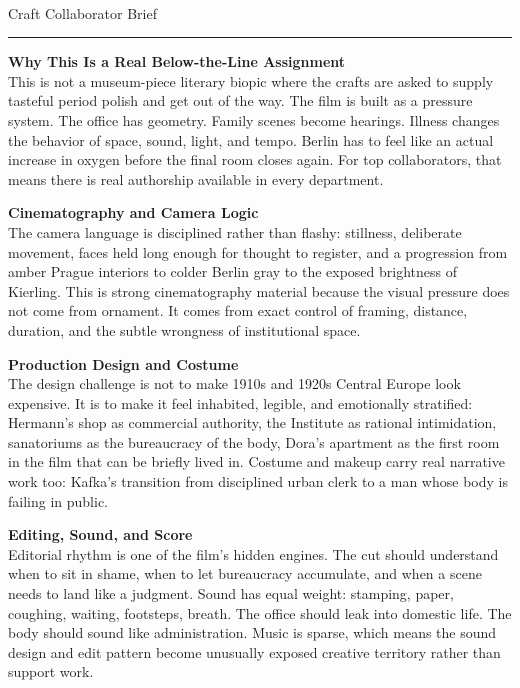 \documentclass[11pt,letterpaper]{article}
\begin{document}
\begin{center}
{\Large\bfseries\sffamily \filmtitleupper}\\[3pt]
{\normalsize\sffamily\color{kafkagray} Craft Collaborator Brief}
\end{center}
\vspace{2pt}
\textcolor{sectionrule}{\rule{\textwidth}{0.5pt}}
\vspace{4pt}

\textbf{Why This Is a Real Below-the-Line Assignment}\\
This is not a museum-piece literary biopic where the crafts are asked to supply tasteful period polish and get out of the way. The film is built as a pressure system. The office has geometry. Family scenes become hearings. Illness changes the behavior of space, sound, light, and tempo. Berlin has to feel like an actual increase in oxygen before the final room closes again. For top collaborators, that means there is real authorship available in every department.

\vspace{2pt}

\textbf{Cinematography and Camera Logic}\\
The camera language is disciplined rather than flashy: stillness, deliberate movement, faces held long enough for thought to register, and a progression from amber Prague interiors to colder Berlin gray to the exposed brightness of Kierling. This is strong cinematography material because the visual pressure does not come from ornament. It comes from exact control of framing, distance, duration, and the subtle wrongness of institutional space.

\vspace{2pt}

\textbf{Production Design and Costume}\\
The design challenge is not to make 1910s and 1920s Central Europe look expensive. It is to make it feel inhabited, legible, and emotionally stratified: Hermann's shop as commercial authority, the Institute as rational intimidation, sanatoriums as the bureaucracy of the body, Dora's apartment as the first room in the film that can be briefly lived in. Costume and makeup carry real narrative work too: Kafka's transition from disciplined urban clerk to a man whose body is failing in public.

\vspace{2pt}

\textbf{Editing, Sound, and Score}\\
Editorial rhythm is one of the film's hidden engines. The cut should understand when to sit in shame, when to let bureaucracy accumulate, and when a scene needs to land like a judgment. Sound has equal weight: stamping, paper, coughing, waiting, footsteps, breath. The office should leak into domestic life. The body should sound like administration. Music is sparse, which means the sound design and edit pattern become unusually exposed creative territory rather than support work.
\end{document}
